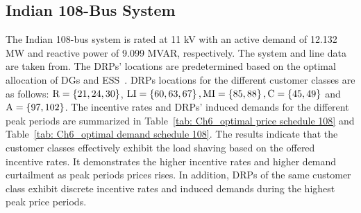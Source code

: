 \documentclass[journal]{IEEEtran}
\begin{document}
\subsection{Indian 108-Bus System}
The Indian 108-bus system is rated at 11 kV with an active demand of 12.132 MW and reactive power of 9.099 MVAR, respectively. The system and line data are taken from\mbox{\cite{meena2018optimal}}. The DRPs' locations are predetermined based on the optimal allocation of DGs and ESS~\mbox{\cite{meena2018optimal}}. DRPs locations for the different customer classes are as follows: \mbox{${\rm{R}} = \left\{ {21,24,30} \right\}$}, \mbox{${\rm{LI}} = \left\{ {60,63,67} \right\},{\rm{MI}} = \left\{ {85,88} \right\},{\rm{C}} = \left\{ {45,49} \right\}$} and \mbox{${\rm{A}} = \left\{ {97,102} \right\}$}. The incentive rates and DRPs' induced demands for the different peak periods are summarized in Table~\mbox{\ref{tab: Ch6_optimal price schedule 108}} and Table~\mbox{\ref{tab: Ch6_optimal demand schedule 108}}. The results indicate that the customer classes effectively exhibit the load shaving based on the offered incentive rates. It demonstrates the higher incentive rates and higher demand curtailment as peak periods prices rises. In addition, DRPs of the same customer class exhibit discrete incentive rates and induced demands during the highest peak price periods. 
\end{document}
